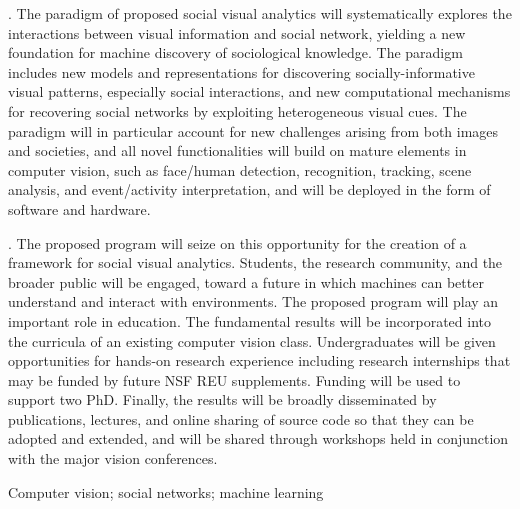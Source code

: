 . The paradigm of proposed social visual analytics will systematically explores the interactions between visual information and social network, yielding a new foundation for machine discovery of sociological knowledge. The paradigm includes new models and representations for discovering socially-informative visual patterns, especially social interactions, and new computational mechanisms for recovering social networks by exploiting heterogeneous visual cues. The paradigm will in particular account for new challenges arising from both images and societies, and all novel functionalities will build on mature elements in computer vision, such as face/human detection, recognition, tracking, scene analysis, and event/activity interpretation, and will be deployed in the form of software and hardware.

. The proposed program will seize on this opportunity for the creation of a framework for social visual analytics. Students, the research community, and the broader public will be engaged, toward a future in which machines can better understand and interact with environments. The proposed program will play an important role in education. The fundamental results will be incorporated into the curricula of an existing computer vision class. Undergraduates will be given opportunities for hands-on research experience including research internships that may be funded by future NSF REU supplements. Funding will be used to support two PhD. Finally, the results will be broadly disseminated by publications, lectures, and online sharing of source code so that they can be adopted and extended, and will be shared through workshops held in conjunction with the major vision conferences. 

 Computer vision; social networks; machine learning


